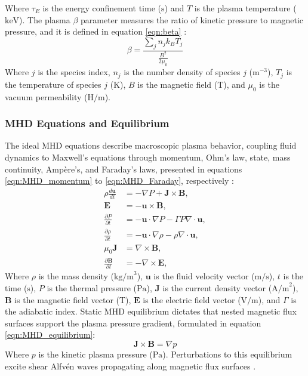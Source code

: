 Where $\tau_E$ is the energy confinement time ($\text{s}$) and $T$ is the plasma temperature ($\text{keV}$). The plasma $\beta$ parameter measures the ratio of kinetic pressure to magnetic pressure, and it is defined in equation \ref{eqn:beta} \cite{chen2016introduction}:
\begin{equation} 
\label{eqn:beta}
\beta = \frac{\sum_j n_j k_B T_j}{\frac{B^2}{2\mu_0}}
\end{equation}
Where $j$ is the species index, $n_j$ is the number density of species $j$ ($\text{m}^{-3}$), $T_j$ is the temperature of species $j$ ($\text{K}$), $B$ is the magnetic field ($\text{T}$), and $\mu_0$ is the vacuum permeability ($\text{H/m}$).

\subsubsection{MHD Equations and Equilibrium}
The ideal MHD equations describe macroscopic plasma behavior, coupling fluid dynamics to Maxwell's equations through momentum, Ohm's law, state, mass continuity, Amp\`ere's, and Faraday's laws, presented in equations \ref{eqn:MHD_momentum} to \ref{eqn:MHD_Faraday}, respectively \cite{zheng, chen2016introduction}:
\begin{align} 
\rho \frac{d\mathbf{u}}{dt} &= -\nabla P + \mathbf{J} \times \mathbf{B}, \label{eqn:MHD_momentum} \\ 
\mathbf{E} &= -\mathbf{u} \times \mathbf{B}, \label{eqn:MHD_Ohm} \\ 
\frac{\partial P}{\partial t} &= -\mathbf{u} \cdot \nabla P - \Gamma P \nabla \cdot \mathbf{u}, \label{eqn:MHD_State} \\ 
\frac{\partial \rho}{\partial t} &= -\mathbf{u} \cdot \nabla \rho - \rho \nabla \cdot \mathbf{u}, \label{eqn:MHD_mass_continuity} \\ 
\mu_0 \mathbf{J} &= \nabla \times \mathbf{B}, \label{eqn:MHD_Ampere} \\ 
\frac{\partial \mathbf{B}}{\partial t} &= -\nabla \times \mathbf{E}, \label{eqn:MHD_Faraday} 
\end{align}
Where $\rho$ is the mass density ($\text{kg/m}^3$), $\mathbf{u}$ is the fluid velocity vector ($\text{m/s}$), $t$ is the time ($\text{s}$), $P$ is the thermal pressure ($\text{Pa}$), $\mathbf{J}$ is the current density vector ($\text{A/m}^2$), $\mathbf{B}$ is the magnetic field vector ($\text{T}$), $\mathbf{E}$ is the electric field vector ($\text{V/m}$), and $\Gamma$ is the adiabatic index. Static MHD equilibrium dictates that nested magnetic flux surfaces support the plasma pressure gradient, formulated in equation \ref{eqn:MHD_equilibrium}:
\begin{equation}
\label{eqn:MHD_equilibrium}
\mathbf{J} \times \mathbf{B} = \nabla p 
\end{equation}
Where $p$ is the kinetic plasma pressure ($\text{Pa}$). Perturbations to this equilibrium excite shear Alfv\'en waves propagating along magnetic flux surfaces \cite{zheng, chen2016introduction}.

